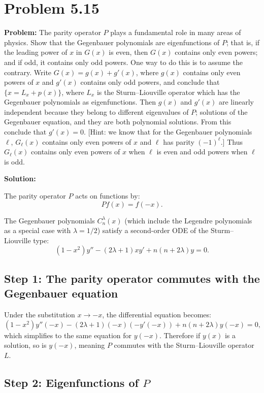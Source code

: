 \documentclass[12pt]{article}
\begin{document}
\section*{Problem 5.15}

\textbf{Problem:} The parity operator $P$ plays a fundamental role in many areas of physics. Show that the Gegenbauer polynomials are eigenfunctions of $P$; that is, if the leading power of $x$ in $G(x)$ is even, then $G(x)$ contains only even powers; and if odd, it contains only odd powers. One way to do this is to assume the contrary. Write $G(x) = g(x) + g'(x)$, where $g(x)$ contains only even powers of $x$ and $g'(x)$ contains only odd powers, and conclude that $\{x = L_x + p(x)\}$, where $L_x$ is the Sturm--Liouville operator which has the Gegenbauer polynomials as eigenfunctions. Then $g(x)$ and $g'(x)$ are linearly independent because they belong to different eigenvalues of $P$; solutions of the Gegenbauer equation, and they are both polynomial solutions. From this conclude that $g'(x) = 0$. [Hint: we know that for the Gegenbauer polynomials $\ell$, $G_\ell(x)$ contains only even powers of $x$ and $\ell$ has parity $(-1)^\ell$.] Thus $G_\ell(x)$ contains only even powers of $x$ when $\ell$ is even and odd powers when $\ell$ is odd.

\bigskip
\textbf{Solution:}

The parity operator $P$ acts on functions by:
\[
Pf(x) = f(-x).
\]

The Gegenbauer polynomials $C_n^\lambda(x)$ (which include the Legendre polynomials as a special case with $\lambda = 1/2$) satisfy a second-order ODE of the Sturm--Liouville type:
\[
(1-x^2)y'' - (2\lambda+1)xy' + n(n+2\lambda)y = 0.
\]

\subsection*{Step 1: The parity operator commutes with the Gegenbauer equation}

Under the substitution $x \to -x$, the differential equation becomes:
\[
(1-x^2)y''(-x) - (2\lambda+1)(-x)(-y'(-x)) + n(n+2\lambda)y(-x) = 0,
\]
which simplifies to the same equation for $y(-x)$. Therefore if $y(x)$ is a solution, so is $y(-x)$, meaning $P$ commutes with the Sturm--Liouville operator $L$.

\subsection*{Step 2: Eigenfunctions of $P$}
\end{document}
